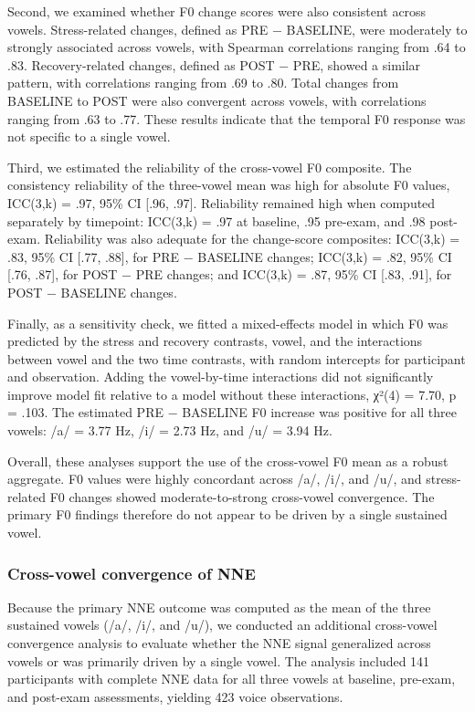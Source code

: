 \documentclass[
  english,
  man,floatsintext]{apa6}
\begin{document}
Second, we examined whether F0 change scores were also consistent across vowels. Stress-related changes, defined as PRE − BASELINE, were moderately to strongly associated across vowels, with Spearman correlations ranging from .64 to .83. Recovery-related changes, defined as POST − PRE, showed a similar pattern, with correlations ranging from .69 to .80. Total changes from BASELINE to POST were also convergent across vowels, with correlations ranging from .63 to .77. These results indicate that the temporal F0 response was not specific to a single vowel.

Third, we estimated the reliability of the cross-vowel F0 composite. The consistency reliability of the three-vowel mean was high for absolute F0 values, ICC(3,k) = .97, 95\% CI {[}.96, .97{]}. Reliability remained high when computed separately by timepoint: ICC(3,k) = .97 at baseline, .95 pre-exam, and .98 post-exam. Reliability was also adequate for the change-score composites: ICC(3,k) = .83, 95\% CI {[}.77, .88{]}, for PRE − BASELINE changes; ICC(3,k) = .82, 95\% CI {[}.76, .87{]}, for POST − PRE changes; and ICC(3,k) = .87, 95\% CI {[}.83, .91{]}, for POST − BASELINE changes.

Finally, as a sensitivity check, we fitted a mixed-effects model in which F0 was predicted by the stress and recovery contrasts, vowel, and the interactions between vowel and the two time contrasts, with random intercepts for participant and observation. Adding the vowel-by-time interactions did not significantly improve model fit relative to a model without these interactions, χ²(4) = 7.70, p = .103. The estimated PRE − BASELINE F0 increase was positive for all three vowels: /a/ = 3.77 Hz, /i/ = 2.73 Hz, and /u/ = 3.94 Hz.

Overall, these analyses support the use of the cross-vowel F0 mean as a robust aggregate. F0 values were highly concordant across /a/, /i/, and /u/, and stress-related F0 changes showed moderate-to-strong cross-vowel convergence. The primary F0 findings therefore do not appear to be driven by a single sustained vowel.

\subsubsection{Cross-vowel convergence of NNE}\label{cross-vowel-convergence-of-nne}

Because the primary NNE outcome was computed as the mean of the three sustained vowels (/a/, /i/, and /u/), we conducted an additional cross-vowel convergence analysis to evaluate whether the NNE signal generalized across vowels or was primarily driven by a single vowel. The analysis included 141 participants with complete NNE data for all three vowels at baseline, pre-exam, and post-exam assessments, yielding 423 voice observations.
\end{document}
